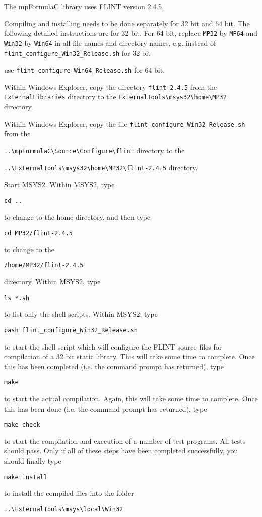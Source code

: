 \vpara
The  mpFormulaC library uses FLINT version 2.4.5.



\vpara
Compiling and installing needs to be done separately for 32 bit and 64 bit. The following detailed instructions are for 32 bit. For 64 bit, replace \verb|MP32| by \verb|MP64| and \verb|Win32| by  \verb|Win64| in all file names and directory names, e.g. instead of \verb|flint_configure_Win32_Release.sh| for 32 bit

use \verb|flint_configure_Win64_Release.sh| for 64 bit.

\vpara
Within Windows Explorer, copy the directory \verb|flint-2.4.5|  from the \verb|ExternalLibraries|
directory to the \verb|ExternalTools\msys32\home\MP32| directory. 

\vpara
Within Windows Explorer, copy the file \verb|flint_configure_Win32_Release.sh|  from the

\verb|..\mpFormulaC\Source\Configure\flint| directory to the 

\verb|..\ExternalTools\msys32\home\MP32\flint-2.4.5| directory.  


\vpara
Start MSYS2. Within MSYS2, type
\begin{verbatim}
cd ..
\end{verbatim}
to change to the home directory, and then type 
\begin{verbatim}
cd MP32/flint-2.4.5
\end{verbatim}
to change to the
\begin{verbatim}
/home/MP32/flint-2.4.5
\end{verbatim}
directory. Within MSYS2, type
\begin{verbatim}
ls *.sh
\end{verbatim}
to list only the shell scripts. Within MSYS2, type
\begin{verbatim}
bash flint_configure_Win32_Release.sh
\end{verbatim}
to start the shell script which will configure the FLINT source files for compilation of a 32 bit static library. This will take some time to complete. Once this has been completed (i.e. the command prompt has returned), type
\begin{verbatim}
make
\end{verbatim}
to start the actual compilation. Again, this will take some time to complete. Once this has been done (i.e. the command prompt has returned), type
\begin{verbatim}
make check
\end{verbatim}
to start the compilation and execution of a number of test programs. All tests should pass. Only if all of these steps have been completed successfully, you should finally type
\begin{verbatim}
make install
\end{verbatim}
to install the compiled files into the folder
\begin{verbatim}
..\ExternalTools\msys\local\Win32
\end{verbatim}



